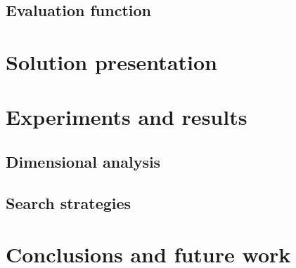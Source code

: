 \documentclass[runningheads]{llncs}
\begin{document}
\subsection{Evaluation function}

\section{Solution presentation}

\section{Experiments and results}

\subsection{Dimensional analysis}

\subsection{Search strategies}

\section{Conclusions and future work}

%
%



\end{document}
